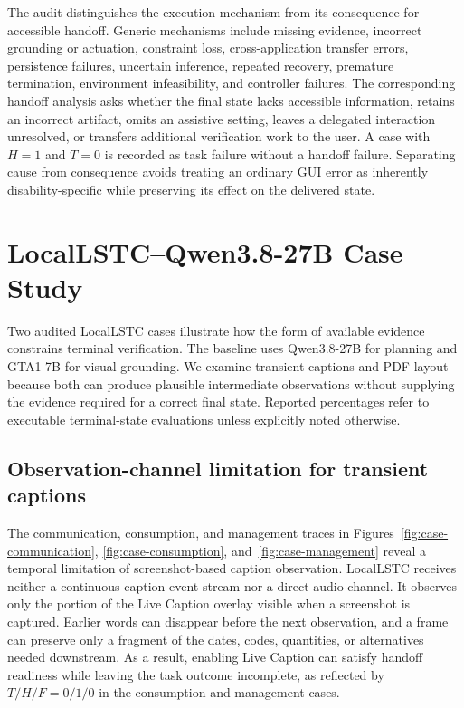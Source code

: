 \documentclass[11pt]{article}
\begin{document}
The audit distinguishes the execution mechanism from its consequence for accessible handoff. Generic mechanisms include missing evidence, incorrect grounding or actuation, constraint loss, cross-application transfer errors, persistence failures, uncertain inference, repeated recovery, premature termination, environment infeasibility, and controller failures. The corresponding handoff analysis asks whether the final state lacks accessible information, retains an incorrect artifact, omits an assistive setting, leaves a delegated interaction unresolved, or transfers additional verification work to the user. A case with $H=1$ and $T=0$ is recorded as task failure without a handoff failure. Separating cause from consequence avoids treating an ordinary GUI error as inherently disability-specific while preserving its effect on the delivered state.

\section{LocalLSTC--Qwen3.8-27B Case Study}
\label{app:locallstc_case}

Two audited LocalLSTC cases illustrate how the form of available evidence constrains terminal verification. The baseline uses Qwen3.8-27B for planning and GTA1-7B for visual grounding. We examine transient captions and PDF layout because both can produce plausible intermediate observations without supplying the evidence required for a correct final state. Reported percentages refer to executable terminal-state evaluations unless explicitly noted otherwise.

\subsection{Observation-channel limitation for transient captions}

The communication, consumption, and management traces in Figures~\ref{fig:case-communication}, \ref{fig:case-consumption}, and~\ref{fig:case-management} reveal a temporal limitation of screenshot-based caption observation. LocalLSTC receives neither a continuous caption-event stream nor a direct audio channel. It observes only the portion of the Live Caption overlay visible when a screenshot is captured. Earlier words can disappear before the next observation, and a frame can preserve only a fragment of the dates, codes, quantities, or alternatives needed downstream. As a result, enabling Live Caption can satisfy handoff readiness while leaving the task outcome incomplete, as reflected by $T/H/F=0/1/0$ in the consumption and management cases.
\end{document}
